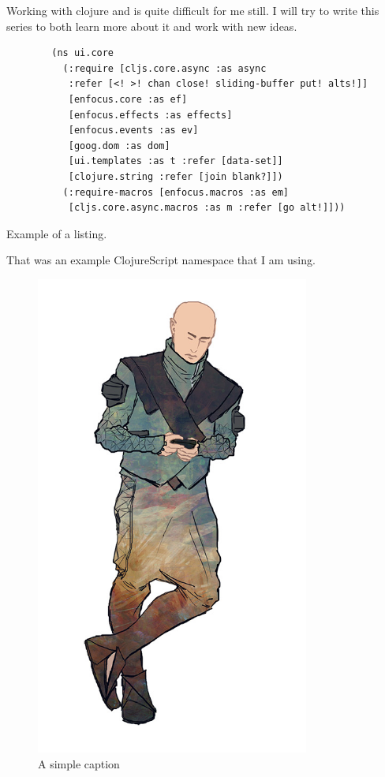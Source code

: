 

\newcommand{\currentPostTitle}{Testing \LaTeX}
\newcommand{\currentPostSubTitle}{text to insert}
\newcommand{\latestKnownVersion}{V0.1}




Working with clojure and is quite difficult for me still. I will try to write this series to both learn more about it and work with new ideas.

\begin{listing}[H]
	\begin{verbatim}
		(ns ui.core
		  (:require [cljs.core.async :as async
		   :refer [<! >! chan close! sliding-buffer put! alts!]]
		   [enfocus.core :as ef]
		   [enfocus.effects :as effects]
		   [enfocus.events :as ev]
		   [goog.dom :as dom]
		   [ui.templates :as t :refer [data-set]]
		   [clojure.string :refer [join blank?]])
		  (:require-macros [enfocus.macros :as em]
		   [cljs.core.async.macros :as m :refer [go alt!]]))	
	\end{verbatim}
	\caption{Example of a listing.}
	\label{lst:example}
\end{listing}

That was an example ClojureScript namespace that I am using.

\begin{figure}[ht!]
	\centering
	\includegraphics[width=90mm]{assets/presentation-pic-3.jpg}
	\caption{A simple caption}
	\label{overflow}
\end{figure}


